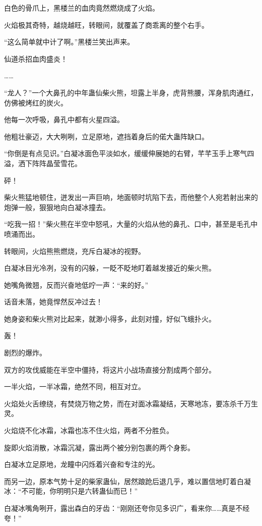 \begin{this_body}
白色的骨爪上，黑楼兰的血肉竟然燃烧成了火焰。

火焰极其奇特，越烧越旺，转眼间，就覆盖了商乖离的整个右手。

“这么简单就中计了啊。”黑楼兰笑出声来。

仙道杀招血肉盛炎！

……

“龙人？”一个大鼻孔的中年蛊仙柴火熊，坦露上半身，虎背熊腰，浑身肌肉通红，仿佛被烤红的炭火。

他每一次呼吸，鼻孔中都有火星四溢。

他粗壮豪迈，大大咧咧，立足原地，遮挡着身后的偌大蛊阵缺口。

“你倒是有点见识。”白凝冰面色平淡如水，缓缓伸展她的右臂，芊芊玉手上寒气四溢，洒下阵阵晶莹雪花。

砰！

柴火熊猛地顿住，迸发出一声巨响，地面顿时坑陷下去，而他整个人宛若射出来的炮弹一般，狠狠地向白凝冰撞去。

“吃我一招！”柴火熊在半空中怒吼，大量的火焰从他的鼻孔、口中，甚至是毛孔中喷涌而出。

转眼间，火焰熊熊燃烧，充斥白凝冰的视野。

白凝冰目光冷冽，没有的闪躲，一眨不眨地盯着越发接近的柴火熊。

她嘴角微翘，反而兴奋地低咛一声：“来的好。”

话音未落，她竟悍然反冲过去！

她身姿和柴火熊对比起来，就渺小得多，此刻对撞，好似飞蛾扑火。

轰！

剧烈的爆炸。

双方的攻伐威能在半空中僵持，将这片小战场直接分割成两个部分。

一半火焰，一半冰霜，绝然不同，相互对立。

火焰处火舌缭绕，有焚烧万物之势，而在对面冰霜凝结，天寒地冻，要冻杀千万生灵。

火焰烧不化冰霜，冰霜也冻不住火焰，两者不分胜负。

旋即火焰消散，冰霜沉凝，露出两个被分别包裹的两个身影。

白凝冰立足原地，龙瞳中闪烁着兴奋和专注的光。

而另一边，原本气势十足的柴家蛊仙，居然踉跄后退几乎，难以置信地盯着白凝冰：“不可能，你明明只是六转蛊仙而已！”

白凝冰嘴角咧开，露出森白的牙齿：“刚刚还夸你见多识广，看来你……真是不经夸！”


\end{this_body}
